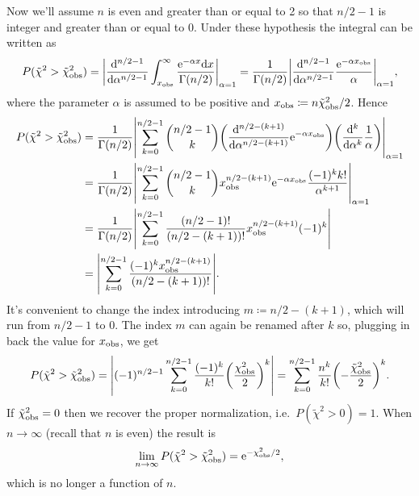 Now we'll assume $n$ is even and greater than or equal to \num{2} so that $n/2-1$ is integer and greater than or equal to \num{0}.
Under these hypothesis the integral can be written as
\begin{equation*}
	P(\tilde\chi^2>\tilde\chi^2_\textup{obs})  =
	\abs*{\deriv[n/2-1]{}{\alpha}\int_{x_\textup{obs}}^\infty\frac{\eu^{-\alpha x} \!\ud x}{\Gamma(n/2)}}_{\alpha=1}
	= \frac{1}{\Gamma(n/2)}\abs*{\deriv[n/2-1]{}{\alpha}\frac{\eu^{-\alpha x_\textup{obs}}}{\alpha}}_{\alpha=1},
\end{equation*}
where the parameter $\alpha$ is assumed to be positive and $x_\textup{obs} \coloneqq n\tilde \chi^2_\textup{obs}/2$.
Hence
\begin{equation*}
	\begin{aligned}
		P(\tilde\chi^2>\tilde\chi^2_\textup{obs})
		&= \frac{1}{\Gamma(n/2)}
		\abs*{\sum_{k=0}^{n/2-1}{n/2-1 \choose k}
			\tp*{\deriv[n/2-(k+1)]{}{\alpha}\eu^{-\alpha x_\textup{obs}}}
			\tp*{\deriv[k]{}{\alpha}\frac{1}{\alpha}}
		}_{\alpha=1}\\
		&= \frac{1}{\Gamma(n/2)}
		\abs*{\sum_{k=0}^{n/2-1}{n/2-1 \choose k}
			x_\textup{obs}^{n/2-(k+1)}\eu^{-\alpha x_\textup{obs}}
			\frac{(-1)^kk!}{\alpha^{k+1}}
		}_{\alpha=1}\\
		&= \frac{1}{\Gamma(n/2)}
		\abs*{\sum_{k=0}^{n/2-1}\frac{(n/2-1)!}{ (n/2 - (k+1))!}
			x_\textup{obs}^{n/2-(k+1)}
			(-1)^k
		}\\
		&=
		\abs*{
			\sum_{k=0}^{n/2-1}\frac{(-1)^kx_\textup{obs}^{n/2-(k+1)}}{(n/2 - (k+1))!}
		}.
	\end{aligned}
\end{equation*}
It's convenient to change the index introducing $m\coloneqq n/2-(k+1)$, which will run from $n/2-1$ to $0$.
The index $m$ can again be renamed after $k$ so, plugging in back the value for $x_\textup{obs}$, we get
\begin{equation}
	P(\tilde\chi^2>\tilde\chi^2_\textup{obs})
	=
	\abs*{(-1)^{n/2-1}
		\sum_{k=0}^{n/2-1}\frac{(-1)^k}{k!}
		\tp*{\frac{\chi^2_\textup{obs}}{2}}^{k}
	}
	=
	\sum_{k=0}^{n/2-1}\frac{n^k}{k!}
	\tp*{-\frac{\tilde \chi^2_\textup{obs}}{2}}^{k}.
\end{equation}
If $\tilde\chi^2_\textup{obs} = 0$ then we recover the proper normalization, i.e.~$P(\tilde\chi^2 > 0) = 1$.
When $n\to\infty$ (recall that $n$ is even) the result is
\begin{equation}
	\lim_{n\to\infty}P(\tilde\chi^2>\tilde\chi^2_\textup{obs}) = \mathrm{e}^{-\chi^2_\textup{obs}/2},
\end{equation}
which is no longer a function of $n$.


